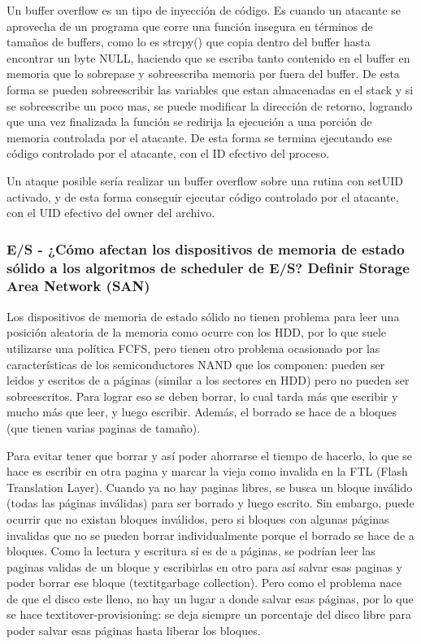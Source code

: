 Un buffer overflow es un tipo de inyección de código. Es cuando un atacante se aprovecha de un programa que corre una función insegura en términos de tamaños de buffers, como lo es strcpy() que copia dentro del buffer hasta encontrar un byte NULL, haciendo que se escriba tanto contenido en el buffer en memoria que lo sobrepase y sobreescriba memoria por fuera del buffer. De esta forma se pueden sobreescribir las variables que estan almacenadas en el stack y si se sobreescribe un poco mas, se puede modificar la dirección de retorno, logrando que una vez finalizada la función se redirija la ejecución a una porción de memoria controlada por el atacante. De esta forma se termina ejecutando ese código controlado por el atacante, con el ID efectivo del proceso.

Un ataque posible sería realizar un buffer overflow sobre una rutina con setUID activado, y de esta forma conseguir ejecutar código controlado por el atacante, con el UID efectivo del owner del archivo.

\subsubsection{E/S - ¿Cómo afectan los dispositivos de memoria de estado sólido a los algoritmos de scheduler de E/S? Definir Storage Area Network (SAN)}

Los dispositivos de memoria de estado sólido no tienen problema para leer una posición aleatoria de la memoria como ocurre con los HDD, por lo que suele utilizarse una política FCFS, pero tienen otro problema ocasionado por las características de los semiconductores NAND que los componen: pueden ser leidos y escritos de a páginas (similar a los sectores en HDD) pero no pueden ser sobreescritos. Para lograr eso se deben borrar, lo cual tarda más que escribir y mucho más que leer, y luego escribir. Además, el borrado se hace de a bloques (que tienen varias paginas de tamaño).

Para evitar tener que borrar y así poder ahorrarse el tiempo de hacerlo, lo que se hace es escribir en otra pagina y marcar la vieja como invalida en la FTL (Flash Translation Layer). Cuando ya no hay paginas libres, se busca un bloque inválido (todas las páginas inválidas) para ser borrado y luego escrito. Sin embargo, puede ocurrir que no existan bloques inválidos, pero si bloques con algunas páginas invalidas que no se pueden borrar individualmente porque el borrado se hace de a bloques. Como la lectura y escritura sí es de a páginas, se podrían leer las paginas validas de un bloque y escribirlas en otro para así salvar esas paginas y poder borrar ese bloque (textit{garbage collection}). Pero como el problema nace de que el disco este lleno, no hay un lugar a donde salvar esas páginas, por lo que se hace textit{over-provisioning}: se deja siempre un porcentaje del disco libre para poder salvar esas páginas hasta liberar los bloques.

